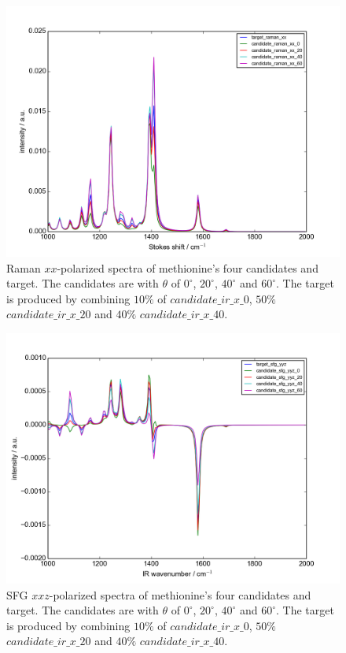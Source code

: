 \begin{figure}[!ht]
\centering
\includegraphics[scale=0.5]{Figures/Met_candidates_plotting_raman_xx.png}
\caption{Raman $xx$-polarized spectra of methionine's four candidates and target. The candidates are with $\theta$ of $0^{\circ}$, $20^{\circ}$, $40^{\circ}$ and $60^{\circ}$. The target is produced by combining $10\%$ of $candidate\_ir\_x\_0$, $50\%$ $candidate\_ir\_x\_20$ and $40\%$ $candidate\_ir\_x\_40$.} \label{fig:2.4}
\end{figure}

\begin{figure}[!ht]
\centering
\includegraphics[scale=0.5]{Figures/Met_candidates_plotting_sfg_yyz.png}
\caption{SFG $xxz$-polarized spectra of methionine's four candidates and target. The candidates are with $\theta$ of $0^{\circ}$, $20^{\circ}$, $40^{\circ}$ and $60^{\circ}$. The target is produced by combining $10\%$ of $candidate\_ir\_x\_0$, $50\%$ $candidate\_ir\_x\_20$ and $40\%$ $candidate\_ir\_x\_40$.} \label{fig:2.5}
\end{figure}

